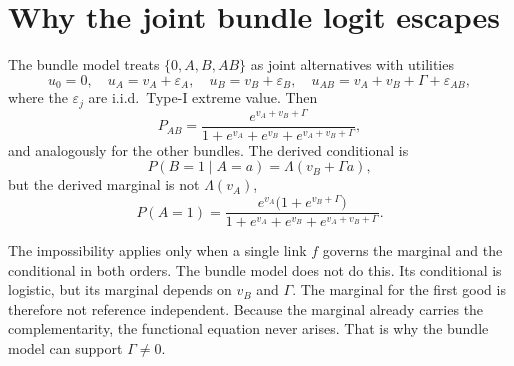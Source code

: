 \documentclass[11pt]{article}
\begin{document}
\section{Why the joint bundle logit escapes}

The bundle model treats $\{0,A,B,AB\}$ as joint alternatives with utilities
\[
u_0=0,\quad u_A=v_A+\varepsilon_A,\quad u_B=v_B+\varepsilon_B,\quad
u_{AB}=v_A+v_B+\Gamma+\varepsilon_{AB},
\]
where the $\varepsilon_j$ are i.i.d.\ Type-I extreme value. Then
\[
P_{AB}=\frac{e^{v_A+v_B+\Gamma}}{1+e^{v_A}+e^{v_B}+e^{v_A+v_B+\Gamma}},
\]
and analogously for the other bundles. The derived conditional is
\[
P(B=1\mid A=a)=\Lambda(v_B+\Gamma a),
\]
but the derived marginal is not $\Lambda(v_A)$,
\[
P(A=1)=\frac{e^{v_A}\bigl(1+e^{v_B+\Gamma}\bigr)}
{1+e^{v_A}+e^{v_B}+e^{v_A+v_B+\Gamma}}.
\]

The impossibility applies only when a single link $f$ governs the marginal
and the conditional in both orders. The bundle model does not do this. Its
conditional is logistic, but its marginal depends on $v_B$ and $\Gamma$.
The marginal for the first good is therefore not reference independent.
Because the marginal already carries the complementarity, the functional
equation never arises. That is why the bundle model can support
$\Gamma\neq0$.
\end{document}
